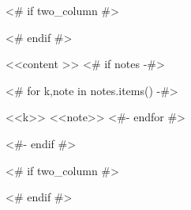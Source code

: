 \begin{<< env  >>}
  \centering
  <# if two_column #>
  \begin{adjustbox}{width=\textwidth}
  <# endif #>
  \begin{threeparttable}
    <<content >>
    <# if notes -#>
    \begin{tablenotes}
      <# for k,note in notes.items() -#>
      \item[<<k>>] <<note>>
      <#- endfor #>
    \end{tablenotes}
    <#- endif #>
  \end{threeparttable}
  <# if two_column #>
  \end{adjustbox}
  <# endif #>
\end{<< env  >>}
